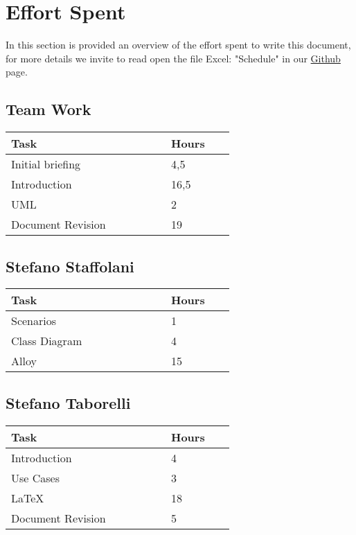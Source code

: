 \section{Effort Spent}
In this section is provided an overview of the effort spent to write this document, for more details we invite to read open the file Excel: "Schedule" in our \href{https://github.com/ViaforaMatteo/StaffolaniTaborelliViafora}{Github} page.
\subsection{Team Work}
\begin{center}
\centering
    \begin{tabular}{@{}p{0.5\linewidth} p{0.2\linewidth}@{}}
        \hline
        \textbf{Task} & \textbf{Hours} \\ \hline
        Initial briefing & 4,5 \\ \hline
        Introduction & 16,5 \\ \hline
        UML & 2\\ \hline
        Document Revision & 19 \\ \hline
    \end{tabular}
\end{center}

\subsection{Stefano Staffolani}
\begin{center}
\centering
    \begin{tabular}{@{}p{0.5\linewidth} p{0.2\linewidth}@{}}
        \hline
        \textbf{Task} & \textbf{Hours} \\ \hline
        Scenarios & 1 \\ \hline
        Class Diagram & 4 \\ \hline
        Alloy & 15\\ \hline
    \end{tabular}
\end{center}

\subsection{Stefano Taborelli}
\begin{center}
\centering
    \begin{tabular}{@{}p{0.5\linewidth} p{0.2\linewidth}@{}}
        \hline
        \textbf{Task} & \textbf{Hours} \\ \hline
        Introduction & 4 \\ \hline
        Use Cases & 3 \\ \hline
        \LaTeX & 18\\ \hline
        Document Revision & 5 \\ \hline
    \end{tabular}
\end{center}

